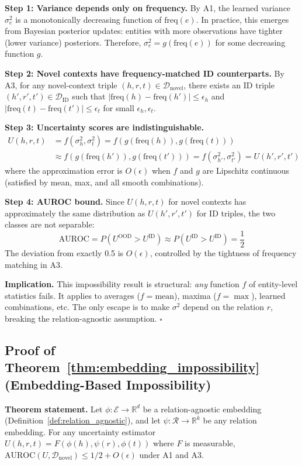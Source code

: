 \documentclass{article}
\newcommand{\freq}{\text{freq}}
\begin{document}
\textbf{Step 1: Variance depends only on frequency.} By A1, the learned variance $\sigma^2_e$ is a monotonically decreasing function of $\freq(e)$. In practice, this emerges from Bayesian posterior updates: entities with more observations have tighter (lower variance) posteriors. Therefore, $\sigma^2_e = g(\freq(e))$ for some decreasing function $g$.

\textbf{Step 2: Novel contexts have frequency-matched ID counterparts.} By A3, for any novel-context triple $(h,r,t) \in \mathcal{D}_{\text{novel}}$, there exists an ID triple $(h',r',t') \in \mathcal{D}_{\text{ID}}$ such that $|\freq(h) - \freq(h')| \leq \epsilon_h$ and $|\freq(t) - \freq(t')| \leq \epsilon_t$ for small $\epsilon_h, \epsilon_t$.

\textbf{Step 3: Uncertainty scores are indistinguishable.}
\begin{align}
U(h,r,t) &= f(\sigma^2_h, \sigma^2_t) = f(g(\freq(h)), g(\freq(t))) \\
&\approx f(g(\freq(h')), g(\freq(t'))) = f(\sigma^2_{h'}, \sigma^2_{t'}) = U(h',r',t')
\end{align}
where the approximation error is $O(\epsilon)$ when $f$ and $g$ are Lipschitz continuous (satisfied by mean, max, and all smooth combinations).

\textbf{Step 4: AUROC bound.} Since $U(h,r,t)$ for novel contexts has approximately the same distribution as $U(h',r',t')$ for ID triples, the two classes are not separable:
\begin{equation}
\text{AUROC} = P(U^{\text{OOD}} > U^{\text{ID}}) \approx P(U^{\text{ID}} > U^{\text{ID}}) = \frac{1}{2}
\end{equation}
The deviation from exactly 0.5 is $O(\epsilon)$, controlled by the tightness of frequency matching in A3.

\textbf{Implication.} This impossibility result is structural: \emph{any} function $f$ of entity-level statistics fails. It applies to averages ($f = \text{mean}$), maxima ($f = \max$), learned combinations, etc. The only escape is to make $\sigma^2$ depend on the relation $r$, breaking the relation-agnostic assumption. $\square$

\subsection{Proof of Theorem~\ref{thm:embedding_impossibility} (Embedding-Based Impossibility)}
\label{app:embedding_proof}

\textbf{Theorem statement.} Let $\phi: \mathcal{E} \to \mathbb{R}^d$ be a relation-agnostic embedding (Definition~\ref{def:relation_agnostic}), and let $\psi: \mathcal{R} \to \mathbb{R}^k$ be any relation embedding. For any uncertainty estimator $U(h,r,t) = F(\phi(h), \psi(r), \phi(t))$ where $F$ is measurable, $\text{AUROC}(U, \mathcal{D}_{\text{novel}}) \leq 1/2 + O(\epsilon)$ under A1 and A3.
\end{document}
